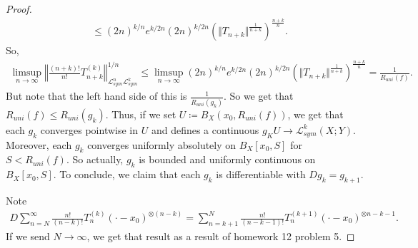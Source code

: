\documentclass{report}
\begin{document}
\begin{proof}
\begin{align*}
        &\leq (2n)^{k/n}e^{k/2n} (2n)^{k/2n} \left(\Vert T_{n+k} \Vert^{\frac{1}{n+k}}\right)^{\frac{n+k}{n}}.
    \end{align*}
    So,
    \begin{align*}
        \limsup_{n\to\infty} \left\Vert \frac{(n+k)!}{n!} T_{n+k}^{(k)}\right\Vert^{1/n}_{\mathcal L^n_{sym} \mathcal L_{sym}^k} \leq \limsup_{n\to\infty} (2n)^{k/n}e^{k/2n} (2n)^{k/2n} \left(\Vert T_{n+k} \Vert^{\frac{1}{n+k}}\right)^{\frac{n+k}{n}} = \frac{1}{R_{uni}(f)}.
    \end{align*}
    But note that the left hand side of this is $\frac{1}{R_{uni}(g_k)}$. So we get that $R_{uni}(f) \leq R_{uni}(g_k)$. Thus, if we set $U \coloneq B_X(x_0, R_{uni}(f))$, we get that each $g_k$ converges pointwise in $U$ and defines a continuous $g_K U \to \mathcal L^k_{sym}(X; Y)$. Moreover, each $g_k$ converges uniformly absolutely on $B_X[x_0, S]$ for $S < R_{uni}(f)$. So actually, $g_k$ is bounded and uniformly continuous on $B_X[x_0, S]$. To conclude, we claim that each $g_k$ is differentiable with $Dg_k = g_{k+1}$. 

    Note 
    \begin{align*}
        D\sum_{n=N}^\infty \frac{n!}{(n-k)!} T_n^{(k)}(\cdot - x_0)^{\otimes(n-k)} = \sum_{n=k+1}^N \frac{n!}{(n-k-1)!} T_n^{(k+1)} (\cdot - x_0)^{\otimes n-k-1}.
    \end{align*}
    If we send $N \to \infty$, we get that result as a result of homework 12 problem 5. 
    
\end{proof}
\end{document}

